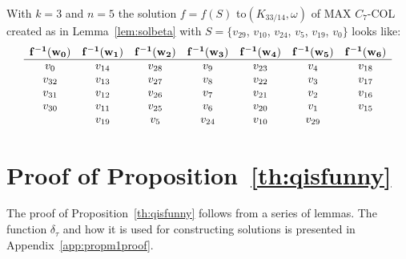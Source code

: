 \documentclass[11pt,a4paper]{article}
\begin{document}
\begin{exmp}
With $k=3$ and $n=5$ the solution $f = f(S)$ to$ (K_{33/14},\omega)$ of MAX $C_7$-COL created as in Lemma~\ref{lem:solbeta} with $S = \{v_{29}$, $v_{10}$, $v_{24}$, $v_{5}$, $v_{19}$, $v_{0}\}$ looks like:
\[
\begin{array}{c c c c c c c}
{\bf f^{-1}(w_0)} & {\bf f^{-1}(w_1)} & {\bf f^{-1}(w_2)} & {\bf f^{-1}(w_3)} & {\bf f^{-1}(w_4)} & {\bf f^{-1}(w_5)} & {\bf f^{-1}(w_6)} \\ \hline
v_0 & v_{14} & v_{28} & v_9 & v_{23} & v_4 & v_{18} \\
v_{32} & v_{13} & v_{27} & v_8 & v_{22} & v_3 & v_{17} \\
v_{31} & v_{12} & v_{26} & v_7 & v_{21} & v_2 & v_{16} \\
v_{30} & v_{11} & v_{25} & v_6 & v_{20} & v_1 & v_{15} \\
& v_{19} & v_5 & v_{24} & v_{10} & v_{29} &
\end{array}
\]
\end{exmp}









\section{Proof of Proposition~\ref{th:qisfunny}}

The proof of Proposition~\ref{th:qisfunny} follows from a series of lemmas.
The function $\delta_{\tau}$ and how it is used for constructing solutions is
presented in Appendix~\ref{app:propm1proof}.
\end{document}
